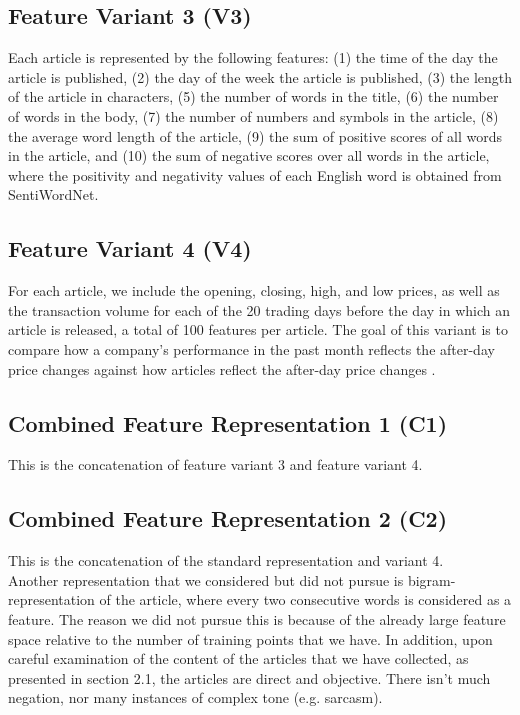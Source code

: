 \documentclass{article}
\begin{document}
\subsection{Feature Variant 3 (V3)}
Each article is represented by the following features: (1) the time of the day the article is published, (2) the day of the week the article is published, (3) the length of the article in characters, (5) the number of words in the title, (6) the number of words in the body, (7) the number of numbers and symbols in the article, (8) the average word length of the article, (9) the sum of positive scores of all words in the article, and (10) the sum of negative scores over all words in the article, where the positivity and negativity values of each English word is obtained from SentiWordNet. 

\subsection{Feature Variant 4 (V4)}
For each article, we include the opening, closing, high, and low prices, as well as the transaction volume for each of the 20 trading days before the day in which an article is released, a total of 100 features per article. The goal of this variant is to compare how a company's performance in the past month reflects the after-day price changes against how articles reflect the after-day price changes . 


\subsection{Combined Feature Representation 1 (C1)}
This is the concatenation of feature variant 3 and feature variant 4. 

\subsection{Combined Feature Representation 2 (C2)}
This is the concatenation of the standard representation and variant 4.\\

Another representation that we considered but did not pursue is bigram-representation of the article, where every two consecutive words is considered as a feature. The reason we did not pursue this is because of the already large feature space relative to the number of training points that we have. In addition, upon careful examination of the content of the articles that we have collected, as presented in section 2.1, the articles are direct and objective. There isn't much negation, nor many instances of complex tone (e.g. sarcasm).
\end{document}

